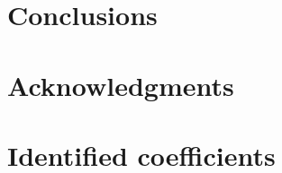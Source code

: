 \documentclass[preprint,11pt,authoryear]{elsarticle}
\begin{document}
\section{Conclusions}
\label{sec:conclusions}

\FloatBarrier

\section*{Acknowledgments}



%


\appendix
\section{Identified coefficients}
\label{sec:coefficients}

\FloatBarrier
\end{document}
